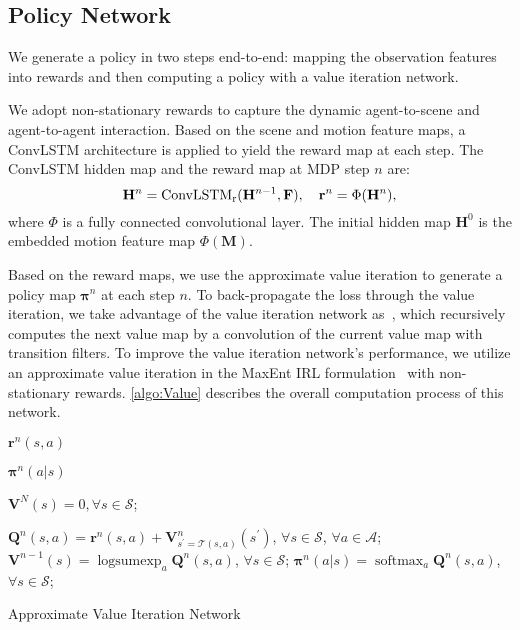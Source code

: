 \documentclass[10pt,twocolumn,letterpaper]{article}
\begin{document}
\subsection{Policy Network}

We generate a policy in two steps end-to-end: mapping the observation features into rewards and then computing a policy with a value iteration network. 

We adopt non-stationary rewards to capture the dynamic agent-to-scene and agent-to-agent interaction. Based on the scene and motion feature maps, a ConvLSTM architecture is applied to yield the reward map at each step. The ConvLSTM hidden map and the reward map at MDP step $n$ are:
\begin{equation}
\mathbf{H}^n=\operatorname{ConvLSTM_r}(\mathbf{H}^{n-1},\mathbf{F}),~~~\mathbf{r}^n=\Phi(\mathbf{H}^n), \notag
\end{equation}
where $\Phi$ is a fully connected convolutional layer. The initial hidden map $\mathbf{H}^0$ is the embedded motion feature map $\Phi(\mathbf{M})$. 

Based on the reward maps, we use the approximate value iteration to generate a policy map $\boldsymbol{\pi}^n$ at each step $n$. To back-propagate the loss through the value iteration, we take advantage of the value iteration network as~\cite{2016Value,rehder2018pedestrian, pflueger2019rover}, which recursively computes the next value map by a convolution of the current value map with transition filters. To improve the value iteration network's performance, we utilize an approximate value iteration in the MaxEnt IRL formulation~\cite{ziebart2008maximum,wulfmeier2017large} with non-stationary rewards. \cref{algo:Value} describes the overall computation process of this network.

\setlength{\textfloatsep}{0.1cm}
\begin{algorithm}[t]
	\begin{algorithmic}[1]
		\Require  $\mathbf{r}^n(s,a)$
		
		\Ensure  $\boldsymbol{\pi}^n(a|s)$
	
		\State $\mathbf{V}^N(s)=0, \forall s \in \mathcal{S}$;
		

		\State $\mathbf{Q}^n(s,a)=\mathbf{r}^n(s,a)+\mathbf{V}^n_{s^{\prime}=\mathcal{T}(s, a)}(s^\prime)$, 		 $\forall s \in \mathcal{S}$, $\forall a \in \mathcal{A}$;
		\State $\mathbf{V}^{n-1}(s)=\operatorname{logsumexp}_a \mathbf{Q}^n(s,a)$, $\forall s \in \mathcal{S}$;
		\State $\boldsymbol{\pi}^n(a|s)=\operatorname{softmax}_a\mathbf{Q}^n(s,a)$, $\forall s \in \mathcal{S}$;
		\EndFor
	\end{algorithmic}
	\caption{Approximate Value Iteration Network}
	\label{algo:Value} 
\end{algorithm}
\setlength{\floatsep}{0.1cm}
\end{document}

